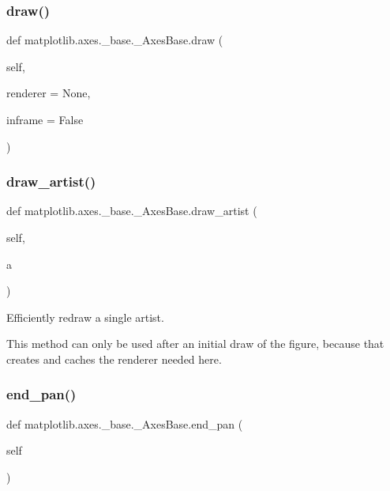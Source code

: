 \subsubsection{\texorpdfstring{draw()}{draw()}}
{\footnotesize\ttfamily def matplotlib.\+axes.\+\_\+base.\+\_\+\+Axes\+Base.\+draw (\begin{DoxyParamCaption}\item[{}]{self,  }\item[{}]{renderer = {\ttfamily None},  }\item[{}]{inframe = {\ttfamily False} }\end{DoxyParamCaption})}

\mbox{\label{classmatplotlib_1_1axes_1_1__base_1_1__AxesBase_a9ea12104cfe6330a2531d37a41dab4eb}} 
\subsubsection{\texorpdfstring{draw\+\_\+artist()}{draw\_artist()}}
{\footnotesize\ttfamily def matplotlib.\+axes.\+\_\+base.\+\_\+\+Axes\+Base.\+draw\+\_\+artist (\begin{DoxyParamCaption}\item[{}]{self,  }\item[{}]{a }\end{DoxyParamCaption})}

\begin{DoxyVerb}Efficiently redraw a single artist.

This method can only be used after an initial draw of the figure,
because that creates and caches the renderer needed here.
\end{DoxyVerb}
 \mbox{\label{classmatplotlib_1_1axes_1_1__base_1_1__AxesBase_a968a08985879050f4198b4043b132eb4}} 
\subsubsection{\texorpdfstring{end\+\_\+pan()}{end\_pan()}}
{\footnotesize\ttfamily def matplotlib.\+axes.\+\_\+base.\+\_\+\+Axes\+Base.\+end\+\_\+pan (\begin{DoxyParamCaption}\item[{}]{self }\end{DoxyParamCaption})}

